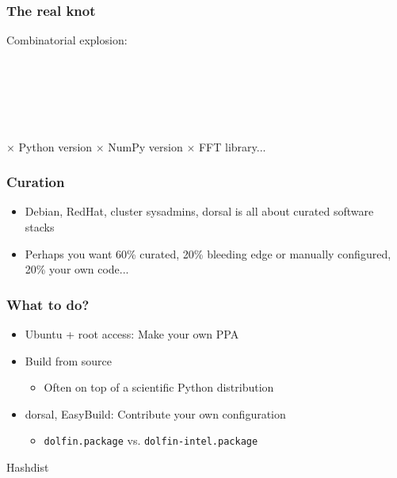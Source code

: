 \documentclass[sans,mathserif]{beamer}
\begin{document}
\begin{frame}
  \frametitle{The real knot}

Combinatorial explosion:

~

~


~

$\times$ Python version $\times$ NumPy version $\times$ FFT library...

\end{frame}


\begin{frame}
  \frametitle{Curation}
  
  \begin{itemize}
  \item<+-> Debian, RedHat, cluster sysadmins, dorsal is all about curated software stacks
  \item<+-> Perhaps you want 60\% curated, 20\% bleeding edge or manually configured, 20\% your own code...
  \end{itemize}
\end{frame}


\begin{frame}
  \frametitle{What to do?}
    \begin{itemize}
    \item<+-> Ubuntu + root access: Make your own PPA
    \item<+-> Build from source
      \begin{itemize}
      \item Often on top of a scientific Python distribution
      \end{itemize}
    \item<+-> dorsal, EasyBuild: Contribute your own configuration
      \begin{itemize}
      \item {\tt dolfin.package} vs. {\tt dolfin-intel.package}
      \end{itemize}
    \end{itemize}
\end{frame}


\begin{frame}
  \begin{center}
    {\LARGE Hashdist}
  \end{center}
\end{frame}
\end{document}
